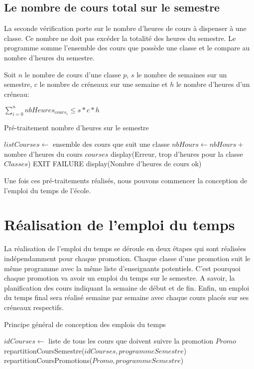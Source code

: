\documentclass[12pt,a4paper,french]{article}
\begin{document}
\newpage

\subsection{Le nombre de cours total sur le semestre}
La seconde vérification porte sur le nombre d'heures de cours à dispenser à une classe. Ce nombre ne doit pas excéder la totalité des heures du semestre. Le programme somme l'ensemble des cours que possède une classe et le compare au nombre d'heures du semestre.

Soit $n$ le nombre de cours d'une classe $p$, $s$ le nombre de semaines sur un semestre, $c$ le nombre de créneaux sur une semaine et $h$ le nombre d'heures d'un créneau: 

\begin{center}
$\sum_{i=0}^n nbHeures_{cours_i} \leq s*c*h$
\end{center}

\begin{algorithm}
\caption{Pré-traitement nombre d'heures sur le semestre}
\begin{algorithmic}
\STATE $listCourses \leftarrow$ ensemble des cours que suit une classe
\STATE $nbHours \leftarrow nbHours +$ nombre d'heures du cours $courses$
\ENDFOR
{}
\STATE display(Erreur, trop d'heures pour la classe $Classes$)
\STATE EXIT FAILURE
\ENDIF
\ENDFOR
\STATE display(Nombre d'heures de cours ok)
\end{algorithmic}
\end{algorithm}

Une fois ces pré-traitements réalisés, nous pouvons commencer la conception de l'emploi du temps de l'école.

\newpage
\section{Réalisation de l'emploi du temps}
La réalisation de l'emploi du temps se déroule en deux étapes qui sont réalisées indépendamment pour chaque promotion. Chaque classe d'une promotion suit le même programme avec la même liste d'enseignants potentiels.
C'est pourquoi chaque promotion va avoir un emploi du temps sur le semestre. A savoir, la planification des cours indiquant la semaine de début et de fin.
Enfin, un emploi du temps final sera réalisé semaine par semaine avec chaque cours placés sur ses créneaux respectifs.
\begin{algorithm}
\caption{Principe général de conception des emplois du temps}
\begin{algorithmic}
\STATE $idCourses \leftarrow$ liste de tous les cours que doivent suivre la promotion $Promo$
\STATE repartitionCoursSemestre($idCourses, programmeSemestre$)
\STATE repartitionCoursPromotions($Promo, programmeSemestre$)
\ENDFOR
\end{algorithmic}
\end{algorithm}
\end{document}
